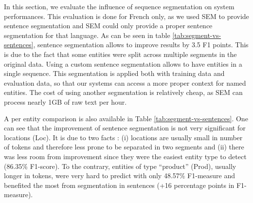


In this section, we evaluate the influence of sequence segmentation on system performances. This evaluation is done for French only, as we used SEM to provide sentence segmentation and SEM could only provide a proper sentence segmentation for that language. As can be seen in table \ref{tab:segment-vs-sentences}, sentence segmentation allows to improve results by 3.5 F1 points. This is due to the fact that some entities were split across multiple segments in the original data. Using a custom sentence segmentation allows to have entities in a single sequence. This segmentation is applied both with training data and evaluation data, so that our systems can access a more proper context for named entities. The cost of using another segmentation is relatively cheap, as SEM can process nearly 1GB of raw text per hour.

A per entity comparison is also available in Table \ref{tab:segment-vs-sentences}.
One can see that the improvement of sentence segmentation is not very significant for locations (Loc). It is due to two facts : (i) locations are usually small in number of tokens and therefore less prone to be separated in two segments and (ii) there was less room from improvement since they were the easiest entity type to detect (86.35\% F1-score).
To the contrary, entities of type ``product'' (Prod), usually longer in tokens, were very hard to predict with only 48.57\% F1-measure and benefited the most from segmentation in sentences (+16 percentage points in F1-measure).


